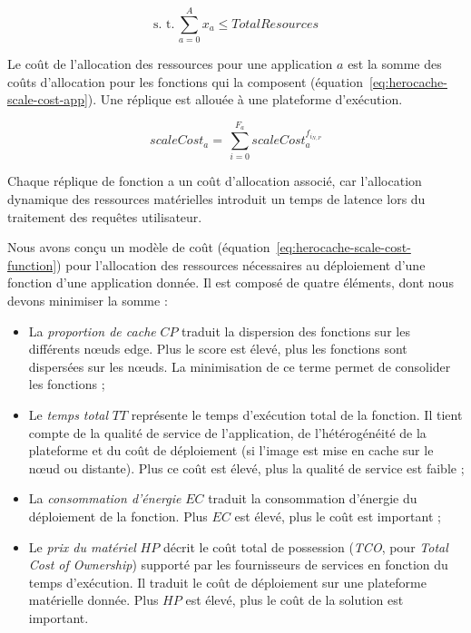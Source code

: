 \begin{equation}
    \text{s. t.} \, \sum_{a = 0}^{A} x_a \leq Total Resources
\label{eq:herocache-constraint-allocation}
\end{equation}

Le coût de l'allocation des ressources pour une application $a$ est la somme des coûts d'allocation pour les fonctions qui la composent (équation~\ref{eq:herocache-scale-cost-app}). Une réplique est allouée à une plateforme d'exécution.

\begin{equation}
    scaleCost_{a} = \, \sum_{i = 0}^{F_{a}} scaleCost^{{f}_{{i}_{N, P}}}_a
\label{eq:herocache-scale-cost-app}
\end{equation}

Chaque réplique de fonction a un coût d'allocation associé, car l'allocation dynamique des ressources matérielles introduit un temps de latence lors du traitement des requêtes utilisateur.

Nous avons conçu un modèle de coût (équation~\ref{eq:herocache-scale-cost-function}) pour l'allocation des ressources nécessaires au déploiement d'une fonction d'une application donnée. Il est composé de quatre éléments, dont nous devons minimiser la somme :

\begin{itemize}
    \item La \textit{proportion de cache} $CP$ traduit la dispersion des fonctions sur les différents nœuds edge. Plus le score est élevé, plus les fonctions sont dispersées sur les nœuds. La minimisation de ce terme permet de consolider les fonctions ;
    \item Le \textit{temps total} $TT$ représente le temps d'exécution total de la fonction. Il tient compte de la qualité de service de l'application, de l'hétérogénéité de la plateforme et du coût de déploiement (si l'image est mise en cache sur le nœud ou distante). Plus ce coût est élevé, plus la qualité de service est faible ;
    \item La \textit{consommation d'énergie} $EC$ traduit la consommation d'énergie du déploiement de la fonction. Plus $EC$ est élevé, plus le coût est important ;
    \item Le \textit{prix du matériel} $HP$ décrit le coût total de possession (\textit{TCO}, pour \textit{Total Cost of Ownership}) supporté par les fournisseurs de services en fonction du temps d'exécution. Il traduit le coût de déploiement sur une plateforme matérielle donnée. Plus $HP$ est élevé, plus le coût de la solution est important.
\end{itemize}

